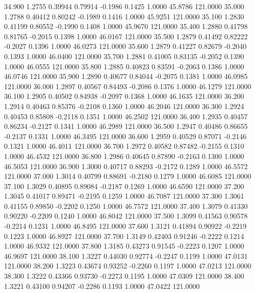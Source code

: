   34.900   1.2755   0.39944   0.79914  -0.1986   0.1425   1.0000  45.8786 121.0000
  35.000   1.2788   0.40412   0.80242  -0.1989   0.1416   1.0000  45.9251 121.0000
  35.100   1.2830   0.41199   0.80552  -0.1990   0.1408   1.0000  45.9670 121.0000
  35.400   1.2880   0.41798   0.81765  -0.2015   0.1398   1.0000  46.0167 121.0000
  35.500   1.2879   0.41492   0.82222  -0.2027   0.1396   1.0000  46.0273 121.0000
  35.600   1.2879   0.41227   0.82679  -0.2040   0.1393   1.0000  46.0400 121.0000
  35.700   1.2881   0.41005   0.83135  -0.2052   0.1390   1.0000  46.0555 121.0000
  35.800   1.2885   0.40823   0.83591  -0.2063   0.1386   1.0000  46.0746 121.0000
  35.900   1.2890   0.40677   0.84044  -0.2075   0.1381   1.0000  46.0985 121.0000
  36.000   1.2897   0.40567   0.84493  -0.2086   0.1376   1.0000  46.1279 121.0000
  36.100   1.2905   0.40502   0.84938  -0.2097   0.1368   1.0000  46.1635 121.0000
  36.200   1.2914   0.40463   0.85376  -0.2108   0.1360   1.0000  46.2046 121.0000
  36.300   1.2924   0.40453   0.85808  -0.2118   0.1351   1.0000  46.2502 121.0000
  36.400   1.2935   0.40457   0.86234  -0.2127   0.1341   1.0000  46.2989 121.0000
  36.500   1.2947   0.40486   0.86655  -0.2137   0.1331   1.0000  46.3495 121.0000
  36.600   1.2959   0.40529   0.87071  -0.2146   0.1321   1.0000  46.4011 121.0000
  36.700   1.2972   0.40582   0.87482  -0.2155   0.1310   1.0000  46.4532 121.0000
  36.800   1.2986   0.40645   0.87890  -0.2163   0.1300   1.0000  46.5053 121.0000
  36.900   1.3000   0.40717   0.88293  -0.2172   0.1289   1.0000  46.5572 121.0000
  37.000   1.3014   0.40799   0.88691  -0.2180   0.1279   1.0000  46.6085 121.0000
  37.100   1.3029   0.40895   0.89084  -0.2187   0.1269   1.0000  46.6590 121.0000
  37.200   1.3045   0.41017   0.89471  -0.2195   0.1259   1.0000  46.7087 121.0000
  37.300   1.3061   0.41155   0.89850  -0.2202   0.1250   1.0000  46.7572 121.0000
  37.400   1.3079   0.41330   0.90220  -0.2209   0.1240   1.0000  46.8042 121.0000
  37.500   1.3099   0.41563   0.90578  -0.2214   0.1231   1.0000  46.8495 121.0000
  37.600   1.3121   0.41894   0.90922  -0.2219   0.1223   1.0000  46.8927 121.0000
  37.700   1.3149   0.42403   0.91246  -0.2222   0.1214   1.0000  46.9332 121.0000
  37.800   1.3185   0.43273   0.91545  -0.2223   0.1207   1.0000  46.9697 121.0000
  38.100   1.3227   0.44030   0.92774  -0.2247   0.1199   1.0000  47.0131 121.0000
  38.200   1.3223   0.43674   0.93252  -0.2260   0.1197   1.0000  47.0213 121.0000
  38.300   1.3222   0.43366   0.93730  -0.2273   0.1195   1.0000  47.0309 121.0000
  38.400   1.3221   0.43100   0.94207  -0.2286   0.1193   1.0000  47.0422 121.0000
